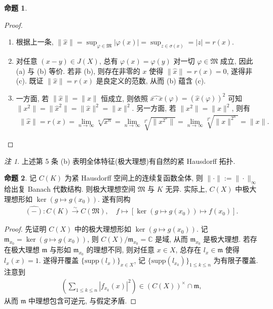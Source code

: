 \documentclass{MainStyle}
\theoremstyle{definition}
\theoremstyle{definition}
\theoremstyle{definition}
\theoremstyle{definition}
\newtheorem{proposition}{命题}
\theoremstyle{definition}
\theoremstyle{definition}
\theoremstyle{definition}
\theoremstyle{remark}
\newtheorem{remark}{注}
\theoremstyle{remark}
\begin{document}
\begin{proposition}
\begin{proof}
\begin{enumerate}
            \item 根据上一条, $\|\hat x\|=\sup_{\varphi \in \mathfrak M}|\varphi (x)|=\sup_{z\in \sigma(x)}=|z|=r(x)$.
            \item 对任意 $(x-y)\in J(X)$, 总有 $\varphi (x)=\varphi(y)$ 对一切 $\varphi\in \mathfrak M$ 成立, 因此 (a) 与 (b) 等价. 若非 (b), 则存在非零的 $x$ 使得 $\|\widehat x\|=r(x)=0$, 遂得非 (c). 既证 $\|\hat x\|=r(x)$ 是良定义的范数, 从而 (b) 蕴含 (c).
            \item 一方面, 若 $\|\widehat x\|=\|x\|$ 恒成立, 则依照 $\widehat{x\cdot x}(\varphi)=(\widehat x(\varphi))^2$ 可知 $\|x^2\|=\|\widehat x^2\|=\|\widehat x\|^2=\|x\|^2$. 另一方面, 若 $\|x^2\|=\|x\|^2$, 则有
                  \begin{align*}
                      \|\widehat x\|=r(x)=\lim_{n\to \infty}\sqrt[n]{x^n}=\lim_{n\to \infty}\sqrt[2^n]{\|x^{2^n}\|}=\lim_{n\to \infty}\sqrt[2^n]{\|x\|^{2^n}}=\|x\|.
                  \end{align*}
        \end{enumerate}
    \end{proof}
\end{proposition}

\begin{remark}
    上述第 5 条 (b) 表明全体特征(极大理想)有自然的紧 Hausdorff 拓扑.
\end{remark}

\begin{proposition}
    记 $C(K)$ 为紧 Hausdorff 空间上的连续复函数全体, 则 $\|\cdot \|:=\|\cdot \|_{\infty}$ 给出复 Banach 代数结构. 则极大理想空间 $\mathfrak M$ 与 $K$ 无异. 实际上, $C(X)$ 中极大理想形如 $\ker(g\mapsto g(x_0))$. 遂有同构
    \begin{align*}
        \widehat{(-)}: C(K)\overset\sim\longrightarrow C(\mathfrak M),\quad f\mapsto [\ker (g\mapsto g(x_0))\mapsto f(x_0)].
    \end{align*}
    \begin{proof}
        先证明 $C(X)$ 中的极大理想形如 $\ker(g\mapsto g(x_0))$. 记 $\mathfrak m_{x_0}=\ker(g\mapsto g(x_0))$, 则 $C(X)/\mathfrak m_{x_0}=\mathbb C$ 是域, 从而 $\mathfrak m_{x_0}$ 是极大理想. 若存在极大理想 $\mathfrak m$ 与形如 $\mathfrak m_{x_0}$ 的理想不同, 则对任意 $x\in X$, 总存在 $l_x\in \mathfrak m$ 使得 $l_x(x)=1$. 遂得开覆盖 $\{\mathrm{supp}(l_x)\}_{x\in X}$, 记 $\{\mathrm{supp}(l_{x_k})\}_{1\leq k \leq n}$ 为有限子覆盖. 注意到
        \begin{align*}
            \left(\sum_{1\leq k\leq n} |f_{x_k}(x)|^2 \right)\in (C(X))^\times \cap \mathfrak m,
        \end{align*}
        从而 $\mathfrak m$ 中理想包含可逆元, 与假定矛盾.
    \end{proof}
\end{proposition}
\end{document}
